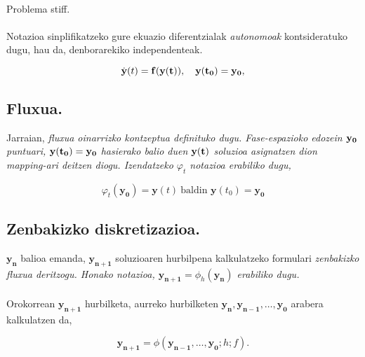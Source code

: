 \paragraph*{} Problema stiff. 

\paragraph*{} Notazioa sinplifikatzeko gure ekuazio diferentzialak \emph{autonomoak} kontsideratuko dugu, hau da, denborarekiko independenteak.

\begin{equation}
\dot{\bf{y}}(t)=\bf{f}(\bf{y}(t)),\ \ \ \bf{y}(t_0)=\bf{y_0},
\end{equation}

\subsection*{Fluxua.}

Jarraian, \it{fluxua} oinarrizko kontzeptua definituko dugu. Fase-espazioko edozein $\bf{y_0}$ puntuari, $\bf{y(t_0)}=\bf{y_0}$ hasierako balio duen $\bf{y(t)}$ soluzioa asignatzen dion mapping-ari deitzen diogu. Izendatzeko $\varphi_t$ notazioa erabiliko dugu,

\begin{equation*}
\varphi_t(\mathbf{y_0})=\mathbf{y}(t) \ \text{baldin $\mathbf{y}(t_0)=\mathbf{y_0}$}
\end{equation*}
  
\subsection*{Zenbakizko diskretizazioa.}

$\mathbf{y_{n}}$ balioa emanda, $\mathbf{y_{n+1}}$ soluzioaren hurbilpena kalkulatzeko formulari \it{zenbakizko fluxua} deritzogu. Honako notazioa, $\mathbf{y_{n+1}}=\phi_h(\mathbf{y_n})$ erabiliko dugu.

\paragraph*{} Orokorrean $\mathbf{y_{n+1}}$ hurbilketa, aurreko hurbilketen $\mathbf{y_n},\mathbf{y_{n-1}},\dots,\mathbf{y_0}$ arabera kalkulatzen da,

\begin{equation*}
\mathbf{y_{n+1}}=\phi(\mathbf{y_{n-1}},\dots,\mathbf{y_0};h;f).
\end{equation*}

